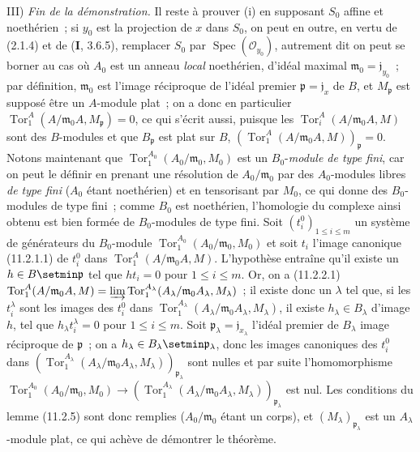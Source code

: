 \medskip
\noindent III) \emph{Fin de la démonstration.} Il reste à prouver
(i) en supposant $S_0$ affine et noethérien~; si $y_0$ est la projection de
$x$ dans $S_0$, on peut en outre, en vertu de (2.1.4) et de
($\mathbf I$, 3.6.5), remplacer $S_0$ par
$\operatorname{Spec}(\mathcal O_{y_0})$, autrement dit on peut se borner au
cas où $A_0$ est un anneau \emph{local} noethérien, d'idéal maximal
$\mathfrak m_0=\mathfrak j_{y_0}$~; par définition, $\mathfrak m_0$ est
l'image réciproque de l'idéal premier $\mathfrak p=\mathfrak j_x$ de $B$,
et $M_{\mathfrak p}$ est supposé être un $A$-module plat~; on a donc en
particulier $\operatorname{Tor}_1^A(A/\mathfrak m_0A,M_{\mathfrak p})=0$,
ce qui s'écrit aussi, puisque les $\operatorname{Tor}_i^A(A/\mathfrak m_0A,M)$
sont des $B$-modules et que $B_{\mathfrak p}$ est plat sur $B$,
$(\operatorname{Tor}_1^A(A/\mathfrak m_0A,M))_{\mathfrak p}=0$.
Notons maintenant que $\operatorname{Tor}_1^{A_0}(A_0/\mathfrak m_0,M_0)$
est un $B_0$-\emph{module de type fini}, car on peut le définir en prenant
une résolution de $A_0/\mathfrak m_0$ par des $A_0$-modules libres
\emph{de type fini} ($A_0$ étant noethérien) et en tensorisant par $M_0$, ce
qui donne des $B_0$-modules de type fini~; comme $B_0$ est noethérien,
l'homologie du complexe ainsi obtenu est bien formée de $B_0$-modules de
type fini. Soit $(t_i^0)_{1\leq i\leq m}$ un système de générateurs du
$B_0$-module $\operatorname{Tor}_1^{A_0}(A_0/\mathfrak m_0,M_0)$ et soit
$t_i$ l'image canonique (11.2.1.1) de $t_i^0$ dans
$\operatorname{Tor}_1^A(A/\mathfrak m_0A,M)$. L'hypothèse entraîne qu'il
existe un $h\in B\setmin\mathfrak p$ tel que $ht_i=0$ pour $1\leq i\leq m$. Or,
on a (11.2.2.1)
$\operatorname{Tor}_1^A(A/\mathfrak m_0A,M)=
\varinjlim\operatorname{Tor}_1^{A_\lambda}
(A_\lambda/\mathfrak m_0A_\lambda,M_\lambda)$~;
il existe donc un $\lambda$ tel que, si les $t_i^\lambda$ sont les images
des $t_i^0$ dans
$\operatorname{Tor}_1^{A_\lambda}(A_\lambda/\mathfrak m_0A_\lambda,
M_\lambda)$, il existe $h_\lambda\in B_\lambda$ d'image $h$, tel que
$h_\lambda t_i^\lambda=0$ pour $1\leq i\leq m$. Soit
$\mathfrak p_\lambda=\mathfrak j_{x_\lambda}$ l'idéal premier de
$B_\lambda$ image réciproque de $\mathfrak p$~; on a
$h_\lambda\in B_\lambda\setmin\mathfrak p_\lambda$, donc les images canoniques
des $t_i^0$ dans
$(\operatorname{Tor}_1^{A_\lambda}(A_\lambda/\mathfrak m_0A_\lambda,
M_\lambda))_{\mathfrak p_\lambda}$ sont nulles et par suite
l'homomorphisme
$\operatorname{Tor}_1^{A_0}(A_0/\mathfrak m_0,M_0)\to
(\operatorname{Tor}_1^{A_\lambda}(A_\lambda/\mathfrak m_0A_\lambda,
M_\lambda))_{\mathfrak p_\lambda}$ est nul. Les conditions du lemme
(11.2.5) sont donc remplies ($A_0/\mathfrak m_0$ étant un corps), et
$(M_\lambda)_{\mathfrak p_\lambda}$ est un $A_\lambda$-module plat, ce qui
achève de démontrer le théorème.

